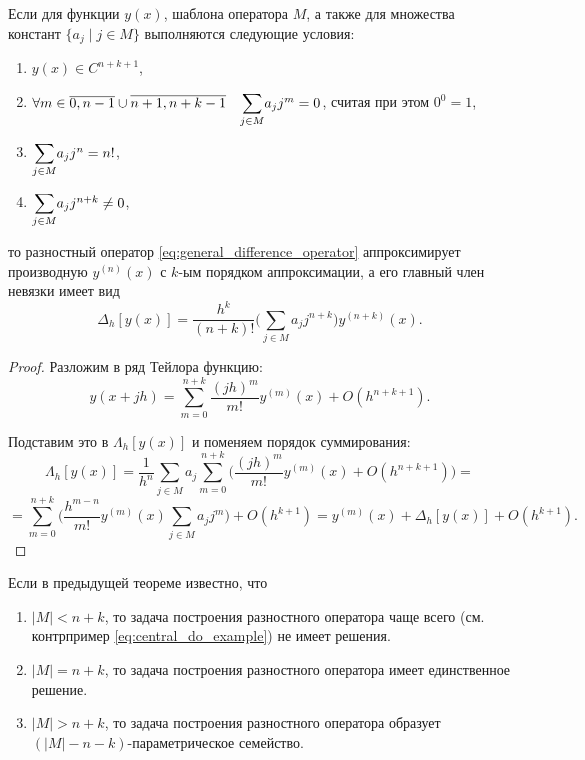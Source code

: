 \documentclass[../main.tex]{subfile}
\begin{document}
\begin{theorem}
\label{eq:general_difference_operator_theorem}
	Если для функции $y(x)$, шаблона оператора $M$, а также для множества
	констант $\{a_j\mid j\in M\}$ выполняются следующие условия:
	\begin{enumerate}[noitemsep]
		\item $y(x)\in C^{n+k+1}$,
		\item $\forall m\in\overline{0,n-1}\cup\overline{n+1,n+k-1}
			\quad\mathlarger\sum_{j\in M}a_jj^m=0$, считая при этом
			$0^0=1$,
		\item $\mathlarger\sum_{j\in M}a_jj^n=n!$,
		\item $\mathlarger\sum_{j\in M}a_jj^{n+k}\ne 0$,
	\end{enumerate}
	то разностный оператор \eqref{eq:general_difference_operator}
	аппроксимирует производную $y^{(n)}(x)$ с $k$-ым порядком аппроксимации,
	а его главный член невязки имеет вид
	\[\boxed{\Delta_h[y(x)]=\frac{h^k}{(n+k)!}\Big(\sum_{j\in M}a_jj^{n+k}\Big)
	y^{(n+k)}(x)}.\]
\end{theorem}

\begin{proof}
	Разложим в ряд Тейлора функцию:
	\[y(x+jh)=\sum_{m=0}^{n+k}\frac{(jh)^m}{m!}y^{(m)}(x)+O(h^{n+k+1}).\]

	Подставим это в $\Lambda_h[y(x)]$ и поменяем порядок суммирования:
	\[\Lambda_h[y(x)]=\frac{1}{h^n}\sum_{j\in M}a_j\sum_{m=0}^{n+k}\Big(
	\frac{(jh)^m}{m!}y^{(m)}(x)+O(h^{n+k+1})\Big)=\]
	\[=\sum_{m=0}^{n+k}\Big(\frac{h^{m-n}}{m!}y^{(m)}(x)\sum_{j\in M}
	a_jj^m\Big)+O(h^{k+1})=y^{(m)}(x)+\Delta_h[y(x)]+O(h^{k+1}).\]
\end{proof}

\begin{corollary}
	Если в предыдущей теореме известно, что
	\begin{enumerate}[nosep]
		\item $|M|<n+k$, то задача построения разностного оператора чаще
			всего (см. контрпример \eqref{eq:central_do_example})
			не имеет решения.
		\item $|M|=n+k$, то задача построения разностного оператора
			 имеет единственное решение.
		\item $|M|>n+k$, то задача построения разностного оператора
			образует $(|M|-n-k)$-параметрическое семейство.
	\end{enumerate}
\end{corollary}
\end{document}

